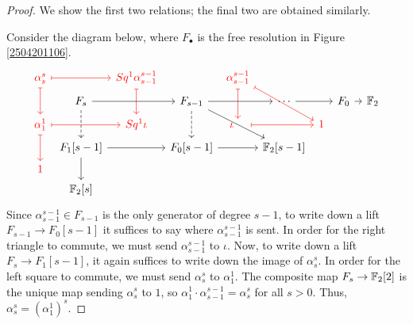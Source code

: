 \documentclass[11pt, titlepage]{article} %
\def\bb{\ensuremath\mathbb}
\def\textcolour{\textcolor}
\numberwithin{equation}{subsection}
\theoremstyle{plain}
\theoremstyle{definition}
\begin{document}
\begin{proof}
We show the first two relations; the final two are obtained similarly. %

Consider the diagram below, where \(F_\bullet\) is the free resolution in Figure \ref{2504201106}.
\[\begin{tikzcd}[row sep = 0.8ex, column sep=0.8ex]
\textcolour{red}{\alpha^s_s} \arrow[rr, "", mapsto, red] \arrow[dd, swap, "", red, mapsto]  & & \textcolour{red}{Sq^1\alpha^{s-1}_{s-1}}  \arrow[dd, ""', red, mapsto] & & \textcolour{red}{\alpha^{s-1}_{s-1}}  \arrow[dd, ""', red, mapsto] \arrow[rrdd, "", red, mapsto] & &&&& \\
& F_s \arrow[rr, swap, ""] \arrow[dd, ""', dashrightarrow] & & F_{s-1} \arrow[dd, ""', dashrightarrow] \arrow[rr, ""'] \arrow[rrdd] & & \cdots \arrow[rr] && F_0 \arrow[rr] && \bb{F}_2 \\
\textcolour{red}{\alpha^1_1} \arrow[rr, swap, "", red, mapsto] \arrow[dd, ""', red, mapsto] & & \textcolour{red}{Sq^1\iota} & & \textcolour{red}{\iota}\;\;\;\; \arrow[rr, ""', red, mapsto] & & \textcolour{red}{1} & & & \\
& F_1[s-1] \arrow[rr, swap, ""] \arrow[dd, ""'] & & F_0[s-1] \arrow[rr, ""'] & & \bb{F}_2[s-1] & & & &\\
\textcolour{red}{1} & &&&&&&&&\\
& \bb{F}_2[s] &&&&&&&&
\end{tikzcd}\]
Since \(\alpha^{s-1}_{s-1}\in F_{s-1}\) is the only generator of degree \(s-1\), to write down a lift \(F_{s-1}\to F_0[s-1]\) it suffices to say where \(\alpha^{s-1}_{s-1}\) is sent. In order for the right triangle to commute, we must send \(\alpha^{s-1}_{s-1}\) to \(\iota\). Now, to write down a lift \(F_s \to F_1[s-1]\), it again suffices to write down the image of \(\alpha^s_s\). In order for the left square to commute, we must send \(\alpha^s_s\) to \(\alpha^1_1\). The composite map \(F_s \to \bb{F}_2[2]\) is the unique map sending \(\alpha^s_s\) to \(1\), so \(\alpha^1_1\cdot \alpha^{s-1}_{s-1}=\alpha^s_s\) for all \(s>0\). Thus, \(\alpha^s_s=(\alpha^1_1)^s\). 


\end{proof}
\end{document}

